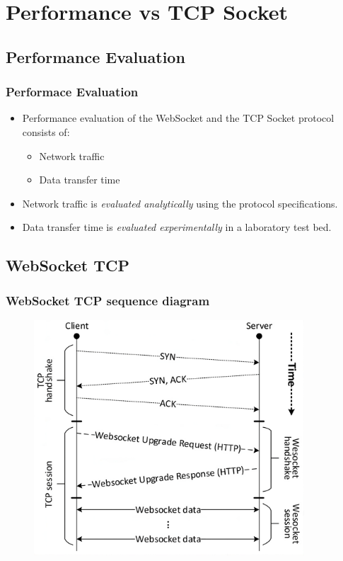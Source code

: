 \documentclass{beamer}
\begin{document}
\section{Performance vs TCP Socket}
\subsection{Performance Evaluation}
\begin{frame}
    \frametitle{Performace Evaluation}
    \begin{itemize}[<+->]
        \item Performance evaluation of the WebSocket and the TCP Socket protocol consists
              of:
              \begin{itemize}[<+->]
                  \item Network traffic
                  \item Data transfer time
              \end{itemize}
        \item Network traffic is \textit{evaluated analytically} using the protocol
              specifications.
        \item Data transfer time is \textit{evaluated experimentally} in a laboratory test
              bed.
    \end{itemize}
\end{frame}

\subsection{WebSocket TCP}
\begin{frame}
    \frametitle{WebSocket TCP sequence diagram}
    \begin{figure}
        \includegraphics[width=0.9\textwidth]{images/websocket_seq_diagram.jpeg}
    \end{figure}
\end{frame}
\end{document}
